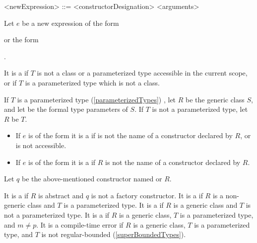 \documentclass[makeidx]{article}
\begin{document}
{\begin{grammar}
<newExpression> ::= \NEW{} <constructorDesignation> <arguments>
\end{grammar}

\LMHash{}%
Let $e$ be a new expression of the form

\noindent
{}
or the form

\noindent
{}.

\LMHash{}%
It is a  if $T$ is not
a class or a parameterized type accessible in the current scope,
or if $T$ is a parameterized type which is not a class.

\LMHash{}%
If $T$ is a parameterized type (\ref{parameterizedTypes})
,
let $R$ be the generic class $S$,
and let
be the formal type parameters of $S$.
If $T$ is not a parameterized type, let $R$ be $T$.

\begin{itemize}
\item
  If $e$ is of the form
  it is a  if  is not the name of
  a constructor declared by $R$, or \id{} is not accessible.
\item
  If $e$ is of the form
  it is a  if $R$ is not the name of
  a constructor declared by $R$.
\end{itemize}

\LMHash{}%
Let $q$ be the above-mentioned constructor named  or $R$.

\LMHash{}%
It is a  if $R$ is abstract
and $q$ is not a factory constructor.
It is a  if $R$ is a non-generic class
and $T$ is a parameterized type.
It is a  if $R$ is a generic class
and $T$ is not a parameterized type.
It is a  if $R$ is a generic class,
$T$ is a parameterized type, and $m \not= p$.
It is a compile-time error if $R$ is a generic class,
$T$ is a parameterized type,
and $T$ is not regular-bounded
(\ref{superBoundedTypes}).

}
\end{document}
